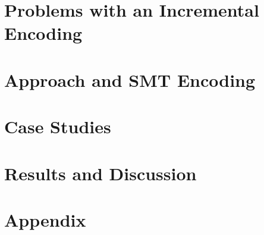 \documentclass[sigconf]{acmart}
\begin{document}
\section{Problems with an Incremental Encoding}

%
\section{Approach and SMT Encoding}

%
\section{Case Studies}

%
\section{Results and Discussion}







\appendix
\section{Appendix}%
\label{appendix:source-code-listings}

\end{document}
